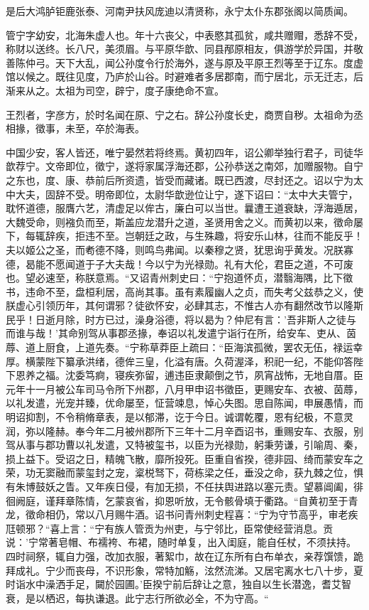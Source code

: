 \documentclass[12pt,UTF8]{ctexbook}
\begin{document}
是后大鸿胪钜鹿张泰、河南尹扶风庞迪以清贤称，永宁太仆东郡张阁以简质闻。

管宁字幼安，北海朱虚人也。年十六丧父，中表愍其孤贫，咸共赠赗，悉辞不受，称财以送终。长八尺，美须眉。与平原华歆、同县邴原相友，俱游学於异国，并敬善陈仲弓。天下大乱，闻公孙度令行於海外，遂与原及平原王烈等至于辽东。度虚馆以候之。既往见度，乃庐於山谷。时避难者多居郡南，而宁居北，示无迁志，后渐来从之。太祖为司空，辟宁，度子康绝命不宣。

王烈者，字彦方，於时名闻在原、宁之右。辞公孙度长史，商贾自秽。太祖命为丞相掾，徵事，未至，卒於海表。

中国少安，客人皆还，唯宁晏然若将终焉。黄初四年，诏公卿举独行君子，司徒华歆荐宁。文帝即位，徵宁，遂将家属浮海还郡，公孙恭送之南郊，加赠服物。自宁之东也，度、康、恭前后所资遗，皆受而藏诸。既已西渡，尽封还之。诏以宁为太中大夫，固辞不受。明帝即位，太尉华歆逊位让宁，遂下诏曰：“太中大夫管宁，耽怀道德，服膺六艺，清虚足以侔古，廉白可以当世。曩遭王道衰缺，浮海遁居，大魏受命，则襁负而至，斯盖应龙潜升之道，圣贤用舍之义。而黄初以来，徵命屡下，每辄辞疾，拒违不至。岂朝廷之政，与生殊趣，将安乐山林，往而不能反乎！夫以姬公之圣，而耇德不降，则鸣鸟弗闻。以秦穆之贤，犹思询乎黄发。况朕寡德，曷能不愿闻道于子大夫哉！今以宁为光禄勋。礼有大伦，君臣之道，不可废也。望必速至，称朕意焉。“又诏青州刺史曰：“宁抱道怀贞，潜翳海隅，比下徵书，违命不至，盘桓利居，高尚其事。虽有素履幽人之贞，而失考父兹恭之义，使朕虚心引领历年，其何谓邪？徒欲怀安，必肆其志，不惟古人亦有翻然改节以隆斯民乎！日逝月除，时方已过，澡身浴德，将以曷为？仲尼有言：'吾非斯人之徒与而谁与哉！'其命别驾从事郡丞掾，奉诏以礼发遣宁诣行在所，给安车、吏从、茵蓐、道上厨食，上道先奏。“宁称草莽臣上疏曰：“臣海滨孤微，罢农无伍，禄运幸厚。横蒙陛下纂承洪绪，德侔三皇，化溢有唐。久荷渥泽，积祀一纪，不能仰答陛下恩养之福。沈委笃痾，寝疾弥留，逋违臣隶颠倒之节，夙宵战怖，无地自厝。臣元年十一月被公车司马令所下州郡，八月甲申诏书徵臣，更赐安车、衣被、茵蓐，以礼发遣，光宠并臻，优命屡至，怔营竦息，悼心失图。思自陈闻，申展愚情，而明诏抑割，不令稍脩章表，是以郁滞，讫于今日。诚谓乾覆，恩有纪极，不意灵润，弥以隆赫。奉今年二月被州郡所下三年十二月辛酉诏书，重赐安车、衣服，别驾从事与郡功曹以礼发遣，又特被玺书，以臣为光禄勋，躬秉劳谦，引喻周、秦，损上益下。受诏之日，精魄飞散，靡所投死。臣重自省揆，德非园、绮而蒙安车之荣，功无窦融而蒙玺封之宠，楶棁驽下，荷栋梁之任，垂没之命，获九棘之位，惧有朱博鼓妖之眚。又年疾日侵，有加无损，不任扶舆进路以塞元责。望慕阊阖，徘徊阙庭，谨拜章陈情，乞蒙哀省，抑恩听放，无令骸骨填于衢路。“自黄初至于青龙，徵命相仍，常以八月赐牛酒。诏书问青州刺史程喜：“宁为守节高乎，审老疾尫顿邪？“喜上言：“宁有族人管贡为州吏，与宁邻比，臣常使经营消息。贡说：'宁常著皂帽、布襦袴、布裙，随时单复，出入闺庭，能自任杖，不须扶持。四时祠祭，辄自力强，改加衣服，著絮巾，故在辽东所有白布单衣，亲荐馔馈，跪拜成礼。宁少而丧母，不识形象，常特加觞，泫然流涕。又居宅离水七八十步，夏时诣水中澡洒手足，闚於园圃。'臣揆宁前后辞让之意，独自以生长潜逸，耆艾智衰，是以栖迟，每执谦退。此宁志行所欲必全，不为守高。“
\end{document}
